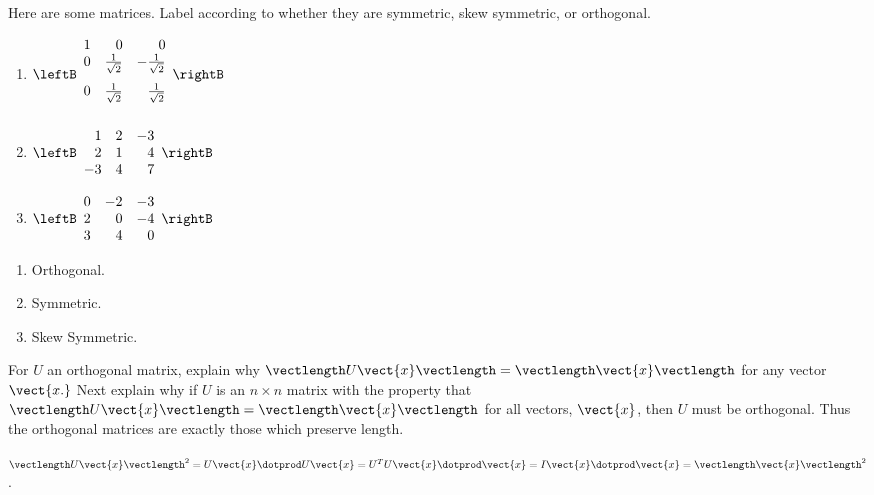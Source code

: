 \begin{enumialphparenastyle}

\begin{ex} Here are some matrices. Label according to whether they
are symmetric, skew symmetric, or orthogonal. 

\begin{enumerate}
\item $\leftB 
\begin{array}{rrr}
1 & 0 & 0 \\ 
0 & \vspace{.05in} \frac{1}{\sqrt{2}} & -\vspace{.05in} \frac{1}{\sqrt{2}}
\\ 
0 & \vspace{.05in} \frac{1}{\sqrt{2}} & \vspace{.05in} \frac{1}{\sqrt{2}}%
\end{array}
\rightB $

\item $\leftB 
\begin{array}{rrr}
1 & 2 & -3 \\ 
2 & 1 & 4 \\ 
-3 & 4 & 7
\end{array}
\rightB $

\item $\leftB 
\begin{array}{rrr}
0 & -2 & -3 \\ 
2 & 0 & -4 \\ 
3 & 4 & 0
\end{array}
\rightB $
\end{enumerate}
\begin{sol}
\begin{enumerate}
\item Orthogonal.
\item Symmetric. 
\item Skew Symmetric. 
\end{enumerate}
\end{sol}
\end{ex}

\begin{ex} For $U$ an orthogonal matrix, explain why $\vectlength U\vect{x}
\vectlength =\vectlength \vect{x}\vectlength $ for any vector $
\vect{x.}$ Next explain why if $U$ is an $n\times n$ matrix with the
property that $\vectlength U\vect{x}\vectlength =\vectlength 
\vect{x}\vectlength $ for all vectors, $\vect{x}$, then $U$ must be
orthogonal. Thus the orthogonal matrices are exactly those which preserve
length.
\begin{sol}
$\vectlength U\vect{x}\vectlength ^{2}=  U\vect{x} \dotprod U
\vect{x}  = U^{T}U\vect{x} \dotprod \vect{x} = I\vect{x} \dotprod \vect{x}
 =\vectlength \vect{x}\vectlength ^{2}$.


\end{sol}
\end{ex}
\end{enumialphparenastyle}

